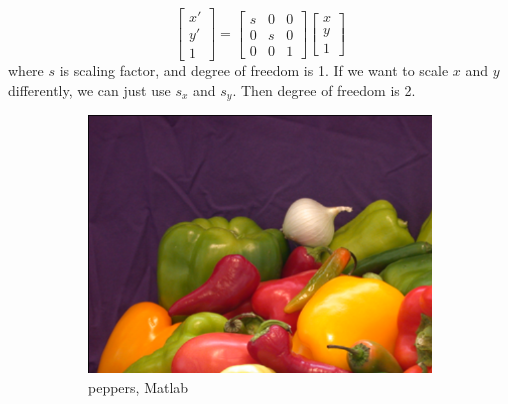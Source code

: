 \documentclass{article}
\begin{document}
$$ \begin{bmatrix}
x' \\ y' \\ 1
\end{bmatrix}
=
\begin{bmatrix}
s & 0 & 0 \\
0 & s & 0 \\
0 & 0 & 1
\end{bmatrix}
\begin{bmatrix}
x \\ y \\ 1
\end{bmatrix} $$
where $s$ is scaling factor, and degree of freedom is 1. 
If we want to scale $x$ and $y$ differently, we can just use $s_x$ and $s_y$. 
Then degree of freedom is 2.

\begin{figure}[!ht]
    \centering
    \begin{subfigure}{0.356\textwidth}
        \includegraphics[width=\textwidth]{./fig/scaling_peppers.png}
        \caption{peppers, Matlab}
    \end{subfigure}
    \begin{subfigure}{0.267\textwidth}

\end{subfigure}
\end{figure}
\end{document}
